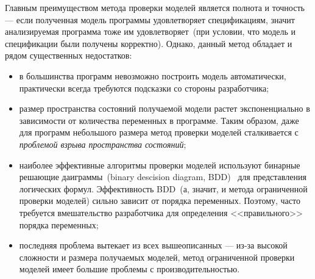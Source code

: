 Главным преимуществом метода проверки моделей является полнота и точность --- 
если полученная модель программы удовлетворяет спецификациям, значит 
анализируемая программа тоже им удовлетворяет~(при условии, что модель и 
спецификации были получены корректно). Однако, данный метод обладает и рядом
существенных недостатков:
\begin{itemize}
\item в большинства программ невозможно построить модель автоматически,
практически всегда требуются подсказки со стороны разработчика;

\item размер пространства состояний получаемой модели растет экспоненциально в 
зависимости от количества переменных в программе. Таким образом, даже для
программ небольшого размера метод проверки моделей сталкивается с 
\textit{проблемой взрыва пространства состояний};

\item наиболее эффективные алгоритмы проверки моделей используют бинарные
решающие даиграммы~(binary descision diagram, BDD)~\cite{bdds} для 
представления логических формул. Эффективность BDD~(а, значит, и метода
ограниченной проверки моделей) сильно зависит от порядка переменных. Поэтому,
часто требуется вмешательство разработчика для определения <<правильного>>
порядка переменных;

\item последняя проблема вытекает из всех вышеописанных --- из-за высокой
сложности и размера получаемых моделей, метод ограниченной проверки моделей
имеет большие проблемы с производительностью.
\end{itemize}

